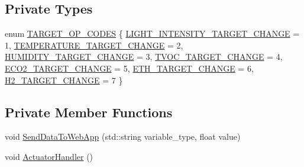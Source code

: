 \subsection*{Private Types}
\begin{DoxyCompactItemize}
\item 
enum \hyperlink{classController_ae0cc6feb81bc46e0859390fd1551ff43}{T\+A\+R\+G\+E\+T\+\_\+\+O\+P\+\_\+\+C\+O\+D\+ES} \{ \newline
\hyperlink{classController_ae0cc6feb81bc46e0859390fd1551ff43a915722d1485a0a671e6d9740e4f336d7}{L\+I\+G\+H\+T\+\_\+\+I\+N\+T\+E\+N\+S\+I\+T\+Y\+\_\+\+T\+A\+R\+G\+E\+T\+\_\+\+C\+H\+A\+N\+GE} = 1, 
\hyperlink{classController_ae0cc6feb81bc46e0859390fd1551ff43a1c6726567b0f23f4431b2b2693b67ec9}{T\+E\+M\+P\+E\+R\+A\+T\+U\+R\+E\+\_\+\+T\+A\+R\+G\+E\+T\+\_\+\+C\+H\+A\+N\+GE} = 2, 
\hyperlink{classController_ae0cc6feb81bc46e0859390fd1551ff43a9380620e3b95492374b3ac3a3e3bd5e7}{H\+U\+M\+I\+D\+I\+T\+Y\+\_\+\+T\+A\+R\+G\+E\+T\+\_\+\+C\+H\+A\+N\+GE} = 3, 
\hyperlink{classController_ae0cc6feb81bc46e0859390fd1551ff43ab7367a898dd3e0befa174fa4e42f1eeb}{T\+V\+O\+C\+\_\+\+T\+A\+R\+G\+E\+T\+\_\+\+C\+H\+A\+N\+GE} = 4, 
\newline
\hyperlink{classController_ae0cc6feb81bc46e0859390fd1551ff43af162eb21304384728b51aad12ef581c3}{E\+C\+O2\+\_\+\+T\+A\+R\+G\+E\+T\+\_\+\+C\+H\+A\+N\+GE} = 5, 
\hyperlink{classController_ae0cc6feb81bc46e0859390fd1551ff43a93b6d3178783a23734c076d193fcb1fb}{E\+T\+H\+\_\+\+T\+A\+R\+G\+E\+T\+\_\+\+C\+H\+A\+N\+GE} = 6, 
\hyperlink{classController_ae0cc6feb81bc46e0859390fd1551ff43a19170325b57f14dd6d349184ed1379e2}{H2\+\_\+\+T\+A\+R\+G\+E\+T\+\_\+\+C\+H\+A\+N\+GE} = 7
 \}
\end{DoxyCompactItemize}
\subsection*{Private Member Functions}
\begin{DoxyCompactItemize}
\item 
void \hyperlink{classController_a9d59ef3807f630a52c964a899a7235dd}{Send\+Data\+To\+Web\+App} (std\+::string variable\+\_\+type, float value)
\item 
void \hyperlink{classController_acd0145853d19eaf3ef9d15f6203ace69}{Actuator\+Handler} ()
\end{DoxyCompactItemize}
